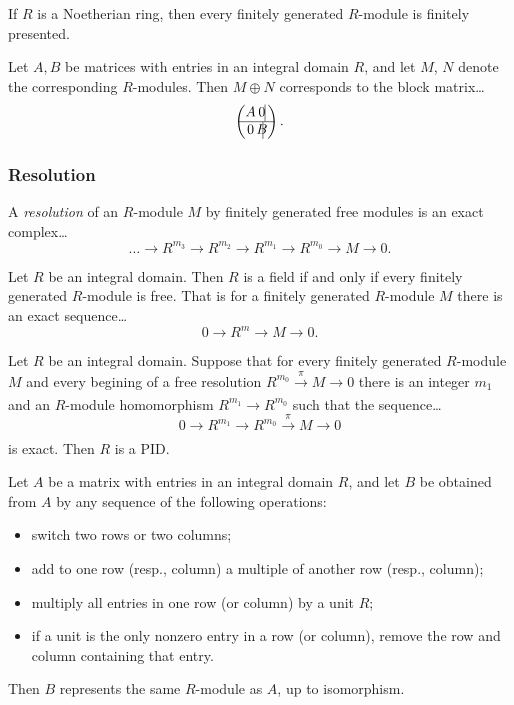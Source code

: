 \begin{lemma}
If $R$ is a Noetherian ring, then every finitely generated $R$-module is finitely presented.
\end{lemma}

\begin{lemma}
Let $A,B$ be matrices with entries in an integral domain $R$, and let $M$, $N$ denote the corresponding $R$-modules. Then
$M \oplus N$ corresponds to the block matrix\dots
\[
\begin{pmatrix}
A & \rvline 0\\ \hline
0 & \rvline B
\end{pmatrix}.
\]
\end{lemma}

\subsubsection{Resolution}\label{resolution}
A \emph{resolution} of an $R$-module $M$ by finitely generated free modules is an exact complex\dots
$$\dots \longrightarrow R^{m_3} \longrightarrow R^{m_2} \longrightarrow R^{m_1} \longrightarrow R^{m_0} \longrightarrow M \longrightarrow 0.$$

\begin{proposition}
Let $R$ be an integral domain. Then $R$ is a field if and only if every finitely generated $R$-module is free. That is for a finitely generated $R$-module $M$
there is an exact sequence\dots
$$0 \longrightarrow R^m \longrightarrow M \longrightarrow 0.$$
\end{proposition}

\begin{proposition}
Let $R$ be an integral domain. Suppose that for every finitely generated $R$-module $M$ and every begining
of a free resolution $R^{m_0} \xrightarrow[]{\pi} M \rightarrow 0$ there is an integer $m_1$ and an $R$-module homomorphism
$R^{m_1} \rightarrow R^{m_0}$ such that the sequence\dots
$$0 \longrightarrow R^{m_1} \longrightarrow R^{m_0} \xrightarrow[]{\pi} M \longrightarrow 0$$
is exact. Then $R$ is a PID.
\end{proposition}

\begin{proposition}
Let $A$ be a matrix with entries in an integral domain $R$, and let $B$ be obtained from $A$ by any sequence of the following operations:
\begin{itemize}
  \item switch two rows or two columns;
  \item add to one row (resp., column) a multiple of another row (resp., column);
  \item multiply all entries in one row (or column) by a unit $R$;
  \item if a unit is the only nonzero entry in a row (or column), remove the row and column containing that entry.
\end{itemize}
Then $B$ represents the same $R$-module as $A$, up to isomorphism.
\end{proposition}